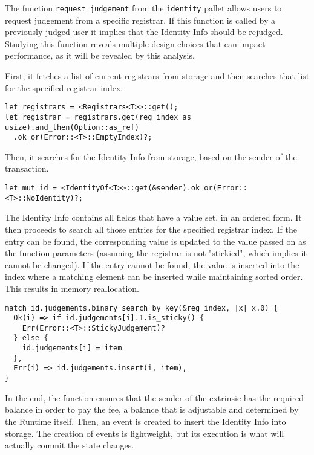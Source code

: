 \documentclass[11pt,a4paper]{article}
\begin{document}
The function \verb|request_judgement| from the \verb|identity| pallet allows
users to request judgement from a specific registrar. If this function is called
by a previously judged user it implies that the Identity Info should be
rejudged. Studying this function reveals multiple design choices that can impact
performance, as it will be revealed by this analysis.
\newline

First, it fetches a list of current registrars from storage and then searches
that list for the specified registrar index.

\begin{verbatim}
let registrars = <Registrars<T>>::get();
let registrar = registrars.get(reg_index as usize).and_then(Option::as_ref)
  .ok_or(Error::<T>::EmptyIndex)?;
\end{verbatim}

Then, it searches for the Identity Info from storage, based on the sender of the
transaction.

\begin{verbatim}
let mut id = <IdentityOf<T>>::get(&sender).ok_or(Error::<T>::NoIdentity)?;
\end{verbatim}

The Identity Info contains all fields that have a value set, in an ordered form.
It then proceeds to search all those entries for the specified registrar index.
If the entry can be found, the corresponding value is updated to the value
passed on as the function parameters (assuming the registrar is not "stickied",
which implies it cannot be changed). If the entry cannot be found, the value is
inserted into the index where a matching element can be inserted while
maintaining sorted order. This results in memory reallocation.

\begin{verbatim}
match id.judgements.binary_search_by_key(&reg_index, |x| x.0) {
  Ok(i) => if id.judgements[i].1.is_sticky() {
    Err(Error::<T>::StickyJudgement)?
  } else {
    id.judgements[i] = item
  },
  Err(i) => id.judgements.insert(i, item),
}
\end{verbatim}

In the end, the function ensures that the sender of the extrinsic has the
required balance in order to pay the fee, a balance that is adjustable and
determined by the Runtime itself. Then, an event is created to insert the
Identity Info into storage. The creation of events is lightweight, but its
execution is what will actually commit the state changes.
\end{document}
